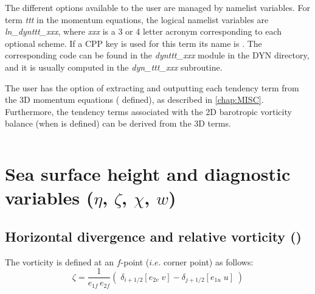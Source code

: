 \documentclass[../tex_main/NEMO_manual]{subfiles}
\begin{document}
The different options available to the user are managed by namelist variables. 
For term \textit{ttt} in the momentum equations, the logical namelist variables are \textit{ln\_dynttt\_xxx}, 
where \textit{xxx} is a 3 or 4 letter acronym corresponding to each optional scheme. 
If a CPP key is used for this term its name is . The corresponding 
code can be found in the \textit{dynttt\_xxx} module in the DYN directory, and it is 
usually computed in the \textit{dyn\_ttt\_xxx} subroutine.

The user has the option of extracting and outputting each tendency term from the
3D momentum equations ( defined), as described in 
\autoref{chap:MISC}.  Furthermore, the tendency terms associated with the 2D 
barotropic vorticity balance (when  is defined) can be derived from the 
3D terms.

$\ $\newline    %

\section{Sea surface height and diagnostic variables ($\eta$, $\zeta$, $\chi$, $w$)}
\label{sec:DYN_divcur_wzv}

\subsection{Horizontal divergence and relative vorticity (\protect{})}
\label{subsec:DYN_divcur}

The vorticity is defined at an $f$-point ($i.e.$ corner point) as follows:
\begin{equation} \label{eq:divcur_cur}
\zeta =\frac{1}{e_{1f}\,e_{2f} }\left( {\;\delta _{i+1/2} \left[ {e_{2v}\;v} \right]
						        -\delta _{j+1/2} \left[ {e_{1u}\;u} \right]\;} \right)
\end{equation} 
\end{document}
